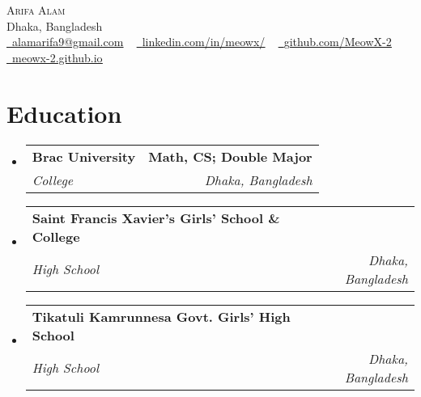 \documentclass[letterpaper,11pt]{article}
\makeatletter
\newcommand{\resumeSubheading}[4]{
  \vspace{-2pt}\item
  \begin{tabular*}{1.0\textwidth}[t]{l@{\extracolsep{\fill}}r}
    \textbf{#1} & \textbf{\small #2} \\
    \textit{\small#3} & \textit{\small #4} \\
  \end{tabular*}\vspace{-7pt}
}
\newcommand{\resumeSubHeadingListStart}{\begin{itemize}[leftmargin=0.0in, label={}]}
\newcommand{\resumeSubHeadingListEnd}{\end{itemize}}
\makeatother
\begin{document}
\begin{center}
	{\Huge \scshape Arifa Alam} \\ \vspace{1pt}
	Dhaka, Bangladesh \\ \vspace{1pt}
	\small
	\href{mailto:alamarifa9@gmail.com}{\faEnvelope\ \underline{alamarifa9@gmail.com}} ~
	\href{https://www.linkedin.com/in/meowx/}{\faLinkedin\ \underline{linkedin.com/in/meowx/}} ~
	\href{https://github.com/MeowX-2}{\faGithub\ \underline{github.com/MeowX-2}} ~
	\href{https://meowx-2.github.io/}{\faGlobe\ \underline{meowx-2.github.io}}
	\vspace{-8pt}
\end{center}

\section{Education}
\resumeSubHeadingListStart
\resumeSubheading{Brac University}{Math, CS; Double Major}{College}{Dhaka, Bangladesh}
\resumeSubheading{Saint Francis Xavier's Girls' School \& College}{}{High School}{Dhaka, Bangladesh}
\resumeSubheading{Tikatuli Kamrunnesa Govt. Girls' High School}{}{High School}{Dhaka, Bangladesh}
\resumeSubHeadingListEnd

\end{document}
